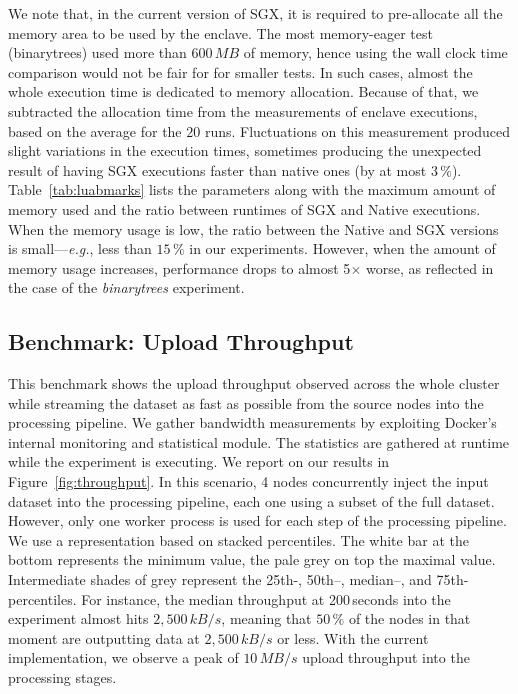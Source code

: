 We note that, in the current version of SGX, it is required to pre-allocate all the memory area to be used by the enclave. 
The most memory-eager test (\textsf{binarytrees}) used more than $600\,MB$ of memory, hence using the wall clock time comparison would not be fair for for smaller tests.
In such cases, almost the whole execution time is dedicated to memory allocation.
Because of that, we subtracted the allocation time from the measurements of enclave executions, based on the average for the $20$ runs.
Fluctuations on this measurement produced slight variations in the execution times, sometimes producing the unexpected result of having SGX executions faster than native ones (by at most $3\,\%$).
Table~\ref{tab:luabmarks} lists the parameters along with the maximum amount of memory used and the ratio between runtimes of SGX and Native executions.
When the memory usage is low, the ratio between the Native and SGX versions is small---\emph{e.g.}, less than $15\,\%$ in our experiments. 
However, when the amount of memory usage increases, performance drops to almost 5$\times$ worse, as reflected in the case of the \emph{binarytrees} experiment.


\subsection{Benchmark: Upload Throughput}
This benchmark shows the upload throughput observed across the whole cluster while streaming the dataset as fast as possible from the source nodes into the processing pipeline.
We gather bandwidth measurements by exploiting Docker's internal monitoring and statistical module.
The statistics are gathered at runtime while the experiment is executing.
We report on our results in Figure~\ref{fig:throughput}.
In this scenario, 4 nodes concurrently inject the input dataset into the processing pipeline, each one using a subset of the full dataset.
However, only one worker process is used for each step of the processing pipeline.
We use a representation based on stacked percentiles.
The white bar at the bottom represents the minimum value, the pale grey on top the maximal value.
Intermediate shades of grey represent the 25th-, 50th–, median–, and 75th-percentiles.
For instance, the median throughput at 200\,seconds into the experiment almost hits $2,500\,kB/s$, meaning that $50\,\%$ of the nodes in that moment are outputting data at $2,500\,kB/s$ or less.
With the current implementation, we observe a peak of $10\,MB/s$ upload throughput into the processing stages.%


